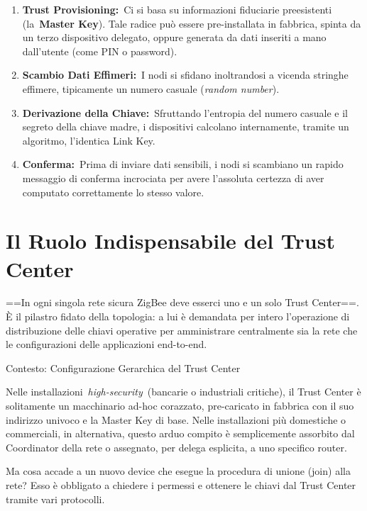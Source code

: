 \documentclass[
  italian,
  openany]{book}
\begin{document}
\begin{enumerate}
\def\labelenumi{\arabic{enumi}.}
\item
  \textbf{Trust Provisioning:}~Ci si basa su informazioni fiduciarie
  preesistenti (la~\textbf{Master Key}). Tale radice può essere
  pre-installata in fabbrica, spinta da un terzo dispositivo delegato,
  oppure generata da dati inseriti a mano dall'utente (come PIN o
  password).
\item
  \textbf{Scambio Dati Effimeri:}~I nodi si sfidano inoltrandosi a
  vicenda stringhe effimere, tipicamente un numero casuale (\emph{random
  number}).
\item
  \textbf{Derivazione della Chiave:}~Sfruttando l'entropia del numero
  casuale e il segreto della chiave madre, i dispositivi calcolano
  internamente, tramite un algoritmo, l'identica Link Key.
\item
  \textbf{Conferma:}~Prima di inviare dati sensibili, i nodi si
  scambiano un rapido messaggio di conferma incrociata per avere
  l'assoluta certezza di aver computato correttamente lo stesso valore.
\end{enumerate}

\section{Il Ruolo Indispensabile del Trust
Center}\label{il-ruolo-indispensabile-del-trust-center}

==In ogni singola rete sicura ZigBee deve esserci uno e un solo Trust
Center==. È il pilastro fidato della topologia: a lui è demandata per
intero l'operazione di distribuzione delle chiavi operative per
amministrare centralmente sia la rete che le configurazioni delle
applicazioni end-to-end.

\begin{calloutnote}{Contesto: Configurazione Gerarchica del Trust Center}

Nelle installazioni~\emph{high-security}~(bancarie o industriali
critiche), il Trust Center è solitamente un macchinario ad-hoc
corazzato, pre-caricato in fabbrica con il suo indirizzo univoco e la
Master Key di base. Nelle installazioni più domestiche o commerciali, in
alternativa, questo arduo compito è semplicemente assorbito dal
Coordinator della rete o assegnato, per delega esplicita, a uno
specifico router.

\end{calloutnote}

Ma cosa accade a un nuovo device che esegue la procedura di unione
(join) alla rete? Esso è obbligato a chiedere i permessi e ottenere le
chiavi dal Trust Center tramite vari protocolli.
\end{document}
